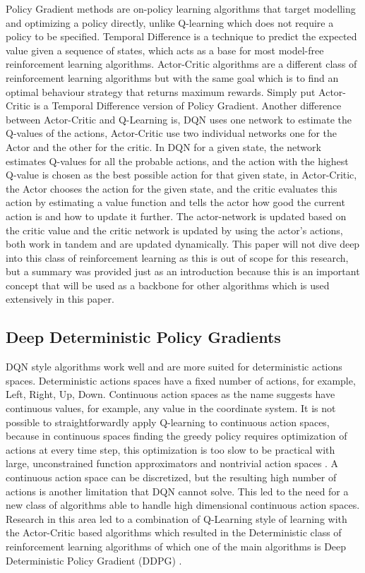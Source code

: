 Policy Gradient \cite{PG} methods are on-policy learning algorithms that target modelling and optimizing a policy directly, unlike Q-learning which does not require a policy to be specified. Temporal Difference \cite{TD} is a technique to predict the expected value given a sequence of states, which acts as a base for most model-free reinforcement learning algorithms. Actor-Critic \cite{Konda00actor-criticalgorithms} algorithms are a different class of reinforcement learning algorithms but with the same goal which is to find an optimal behaviour strategy that returns maximum rewards.  Simply put Actor-Critic is a Temporal Difference version of Policy Gradient. Another difference between Actor-Critic and Q-Learning is, DQN uses one network to estimate the Q-values of the actions, Actor-Critic use two individual networks one for the Actor and the other for the critic. In DQN for a given state, the network estimates Q-values for all the probable actions, and the action with the highest Q-value is chosen as the best possible action for that given state, in Actor-Critic, the Actor chooses the action for the given state, and the critic evaluates this action by estimating a value function and tells the actor how good the current action is and how to update it further. The actor-network is updated based on the critic value and the critic network is updated by using the actor's actions, both work in tandem and are updated dynamically. This paper will not dive deep into this class of reinforcement learning as this is out of scope for this research, but a summary was provided just as an introduction because this is an important concept that will be used as a backbone for other algorithms which is used extensively in this paper. \\

\subsection{Deep Deterministic Policy Gradients}

DQN style algorithms work well and are more suited for deterministic actions spaces. Deterministic actions spaces have a fixed number of actions, for example, Left, Right, Up, Down. Continuous action spaces as the name suggests have continuous values, for example, any value in the coordinate system. It is not possible to straightforwardly apply Q-learning to continuous action spaces, because in continuous spaces finding the greedy policy requires optimization of actions at every time step, this optimization is too slow to be practical with large, unconstrained function approximators and nontrivial action spaces \cite{lillicrap2019continuous}. A continuous action space can be discretized, but the resulting high number of actions is another limitation that DQN cannot solve. This led to the need for a new class of algorithms able to handle high dimensional continuous action spaces. Research in this area led to a combination of Q-Learning style of learning with the Actor-Critic based algorithms which resulted in the Deterministic class of reinforcement learning algorithms of which one of the main algorithms is Deep Deterministic Policy Gradient (DDPG) \cite{lillicrap2019continuous}. \\

